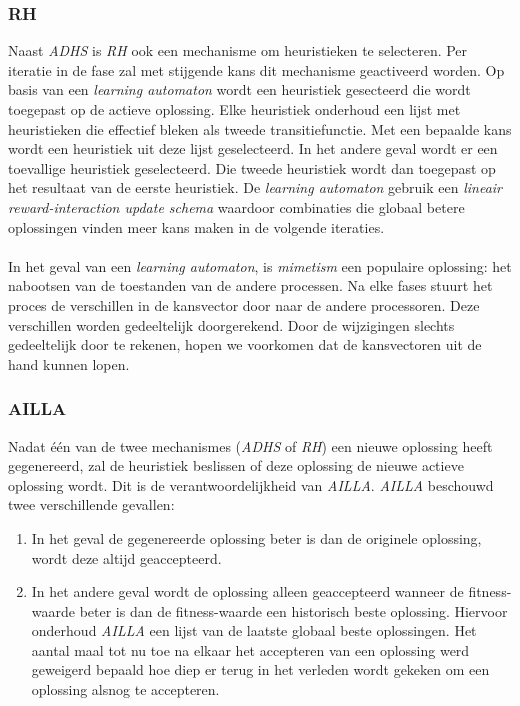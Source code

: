 \subsubsection{RH}
Naast \emph{ADHS} is \emph{RH} ook een mechanisme om heuristieken te selecteren. Per iteratie in de fase zal met stijgende kans dit mechanisme geactiveerd worden. Op basis van een \emph{learning automaton} wordt een heuristiek gesecteerd die wordt toegepast op de actieve oplossing. Elke heuristiek onderhoud een lijst met heuristieken die effectief bleken als tweede transitiefunctie. Met een bepaalde kans wordt een heuristiek uit deze lijst geselecteerd. In het andere geval wordt er een toevallige heuristiek geselecteerd. Die tweede heuristiek wordt dan toegepast op het resultaat van de eerste heuristiek. De \emph{learning automaton} gebruik een \emph{lineair reward-interaction update schema} waardoor combinaties die globaal betere oplossingen vinden meer kans maken in de volgende iteraties.

\paragraph{}
In het geval van een \emph{learning automaton}, is \emph{mimetism} een populaire oplossing: het nabootsen van de toestanden van de andere processen. Na elke fases stuurt het proces de verschillen in de kansvector door naar de andere processoren. Deze verschillen worden gedeeltelijk doorgerekend. Door de wijzigingen slechts gedeeltelijk door te rekenen, hopen we voorkomen dat de kansvectoren uit de hand kunnen lopen.

\subsubsection{AILLA}
Nadat \'e\'en van de twee mechanismes (\emph{ADHS} of \emph{RH}) een nieuwe oplossing heeft gegenereerd, zal de heuristiek beslissen of deze oplossing de nieuwe actieve oplossing wordt. Dit is de verantwoordelijkheid van \emph{AILLA}. \emph{AILLA} beschouwd twee verschillende gevallen:
\begin{enumerate}
 \item In het geval de gegenereerde oplossing beter is dan de originele oplossing, wordt deze altijd geaccepteerd.
 \item In het andere geval wordt de oplossing alleen geaccepteerd wanneer de fitness-waarde beter is dan de fitness-waarde een historisch beste oplossing. Hiervoor onderhoud \emph{AILLA} een lijst van de laatste globaal beste oplossingen. Het aantal maal tot nu toe na elkaar het accepteren van een oplossing werd geweigerd bepaald hoe diep er terug in het verleden wordt gekeken om een oplossing alsnog te accepteren.
\end{enumerate}

